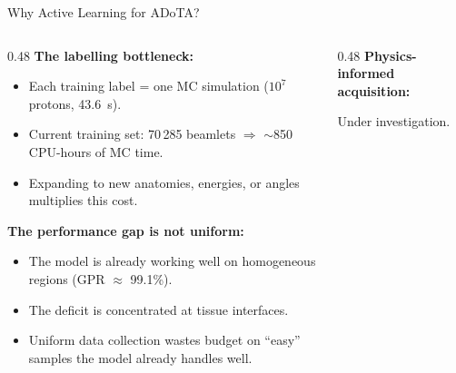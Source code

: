 \documentclass[aspectratio=169, 10pt]{beamer}
\begin{document}
\begin{frame}{Why Active Learning for ADoTA?}
  \begin{columns}[T]
    \begin{column}{0.48\textwidth}
      \textbf{The labelling bottleneck:}
      \begin{itemize}\setlength{\itemsep}{4pt}
        \item Each training label = one MC simulation
              ($10^7$ protons, \SI{43.6}{s}).
        \item Current training set: 70\,285 beamlets
              $\Rightarrow$ $\sim$850 CPU-hours of MC time.
        \item Expanding to new anatomies, energies, or angles
              multiplies this cost.
      \end{itemize}

      \vspace{6pt}
      \textbf{The performance gap is not uniform:}
      \begin{itemize}\setlength{\itemsep}{4pt}
        \item The model is already working well on homogeneous regions
              (GPR $\approx$ 99.1\%).
        \item The deficit is concentrated at tissue interfaces.
        \item Uniform data collection wastes budget on ``easy''
              samples the model already handles well.
      \end{itemize}
    \end{column}
    \begin{column}{0.48\textwidth}
      \textbf{Physics-informed acquisition:}

      \vspace{4pt}
      Under investigation.
    \end{column}
  \end{columns}
\end{frame}
\end{document}
